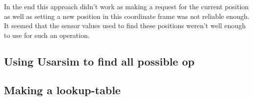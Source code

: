 \documentclass[a4paper]{article}
\begin{document}
In the end this approach didn't work as making a request for the current
position as well as setting a new position in this coordinate frame was not
reliable enough. It seemed that the sensor values used to find these positions
weren't well enough to use for such an operation.

\subsection{Using Usarsim to find all possible op}

\subsection{Making a lookup-table}



\end{document}
